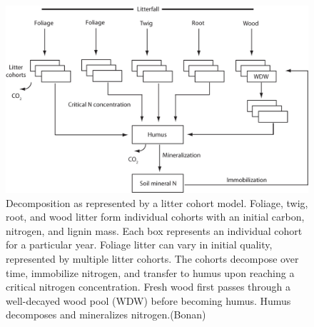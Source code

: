\documentclass[
  12pt,
  oneside]{book}
\begin{document}
\begin{figure}

{\centering \includegraphics[width=0.8\linewidth]{figures/chap5/f517_litter_cohort} 

}

\caption{Decomposition as represented by a litter cohort model. Foliage, twig, root, and wood litter form individual cohorts with an initial carbon, nitrogen, and lignin mass. Each box represents an individual cohort for a particular year. Foliage litter can vary in initial quality, represented by multiple litter cohorts. The cohorts decompose over time, immobilize nitrogen, and transfer to humus upon reaching a critical nitrogen concentration. Fresh wood first passes through a well-decayed wood pool (WDW) before becoming humus. Humus decomposes and mineralizes nitrogen.(Bonan)}\label{fig:f517}
\end{figure}
\end{document}
